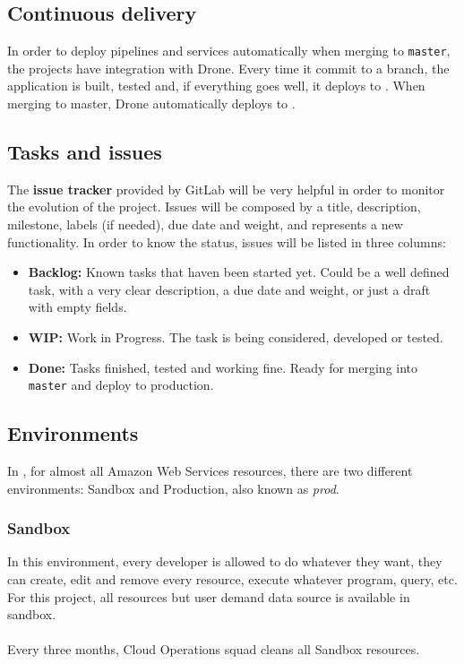 \subsection{Continuous delivery}

In order to deploy pipelines and services automatically when merging to \texttt{master}, the projects have integration with Drone\cite{drone}. Every time it commit to a branch, the application is built, tested and, if everything goes well, it deploys to . When merging to master, Drone automatically deploys to .

\subsection{Tasks and issues}

The \textbf{issue tracker} provided by GitLab\cite{gitlab} will be very helpful in order to monitor the evolution of the project. Issues will be composed by a title, description, milestone, labels (if needed), due date and weight, and represents a new functionality. In order to know the status, issues will be listed in three columns:

\begin{itemize}
    \item \textbf{Backlog:} Known tasks that haven been started yet. Could be a well defined task, with a very clear description, a due date and weight, or just a draft with empty fields.
    \item \textbf{WIP:} Work in Progress. The task is being considered, developed or tested.
    \item \textbf{Done:} Tasks finished, tested and working fine. Ready for merging into \texttt{master} and deploy to production.
\end{itemize}

\subsection{Environments} \label{environments}

In \company, for almost all Amazon Web Services resources, there are two different environments: Sandbox and Production, also known as \textit{prod}.

\subsubsection*{Sandbox} \label{sandbox}

In this environment, every developer is allowed to do whatever they want, they can create, edit and remove every resource, execute whatever program, query, etc. For this project, all resources but user demand data source is available in sandbox.
\\\\
Every three months, Cloud Operations squad cleans all Sandbox resources.

